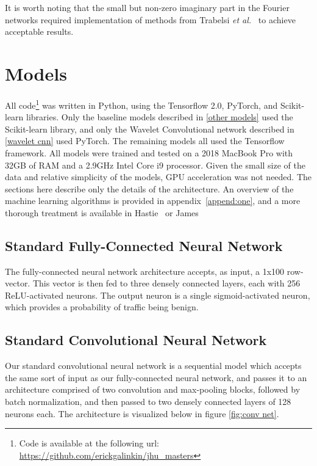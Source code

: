 \renewcommand{\thefootnote}{1}
It is worth noting that the small but non-zero imaginary part in the Fourier networks required implementation of methods from Trabelsi \textit{et al.}~\cite{trabelsi2017deep} to achieve acceptable results. 



\section{Models}
All code\footnote{Code is available at the following url: \url{https://github.com/erickgalinkin/jhu_masters}} was written in Python, using the Tensorflow 2.0, PyTorch, and Scikit-learn libraries.
Only the baseline models described in \ref{other models} used the Scikit-learn library, and only the Wavelet Convolutional network described in \ref{wavelet cnn} used PyTorch.
The remaining models all used the Tensorflow framework.
All models were trained and tested on a 2018 MacBook Pro with 32GB of RAM and a 2.9GHz Intel Core i9 processor.
Given the small size of the data and relative simplicity of the models, GPU acceleration was not needed.
The sections here describe only the details of the architecture.
An overview of the machine learning algorithms is provided in appendix~\ref{append:one}, and a more thorough treatment is available in Hastie~\cite{hastie01statisticallearning} or James~\cite{james14introduction}

\subsection{Standard Fully-Connected Neural Network}
The fully-connected neural network architecture accepts, as input, a 1x100 row-vector. 
This vector is then fed to three densely connected layers, each with 256 ReLU-activated neurons.
The output neuron is a single sigmoid-activated neuron, which provides a probability of traffic being benign.

\subsection{Standard Convolutional Neural Network}
Our standard convolutional neural network is a sequential model which accepts the same sort of input as our fully-connected neural network, and passes it to an architecture comprised of two convolution and max-pooling blocks, followed by batch normalization, and then passed to two densely connected layers of 128 neurons each. The architecture is visualized below in figure \ref{fig:conv net}.

